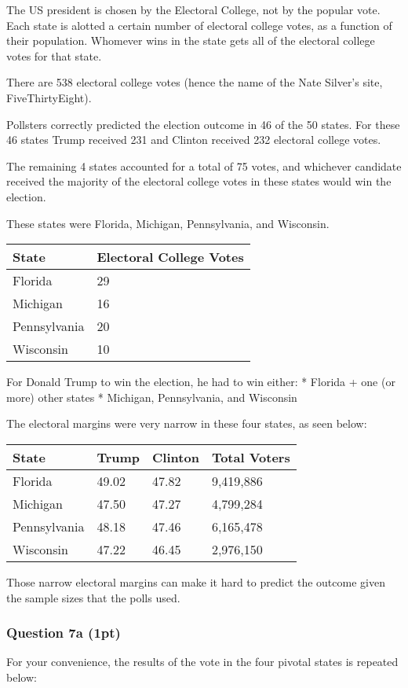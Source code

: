 \documentclass[11pt]{article}
\begin{document}
The US president is chosen by the Electoral College, not by the popular
vote. Each state is alotted a certain number of electoral college votes,
as a function of their population. Whomever wins in the state gets all
of the electoral college votes for that state.

There are 538 electoral college votes (hence the name of the Nate
Silver's site, FiveThirtyEight).

Pollsters correctly predicted the election outcome in 46 of the 50
states. For these 46 states Trump received 231 and Clinton received 232
electoral college votes.

The remaining 4 states accounted for a total of 75 votes, and whichever
candidate received the majority of the electoral college votes in these
states would win the election.

These states were Florida, Michigan, Pennsylvania, and Wisconsin.

\begin{longtable}[]{@{}ll@{}}
\toprule
State & Electoral College Votes\tabularnewline
\midrule
\endhead
Florida & 29\tabularnewline
Michigan & 16\tabularnewline
Pennsylvania & 20\tabularnewline
Wisconsin & 10\tabularnewline
\bottomrule
\end{longtable}

For Donald Trump to win the election, he had to win either: * Florida +
one (or more) other states * Michigan, Pennsylvania, and Wisconsin

The electoral margins were very narrow in these four states, as seen
below:

\begin{longtable}[]{@{}llll@{}}
\toprule
State & Trump & Clinton & Total Voters\tabularnewline
\midrule
\endhead
Florida & 49.02 & 47.82 & 9,419,886\tabularnewline
Michigan & 47.50 & 47.27 & 4,799,284\tabularnewline
Pennsylvania & 48.18 & 47.46 & 6,165,478\tabularnewline
Wisconsin & 47.22 & 46.45 & 2,976,150\tabularnewline
\bottomrule
\end{longtable}

Those narrow electoral margins can make it hard to predict the outcome
given the sample sizes that the polls used.

    \subsubsection{Question 7a (1pt)}\label{question-7a-1pt}

For your convenience, the results of the vote in the four pivotal states
is repeated below:
\end{document}
